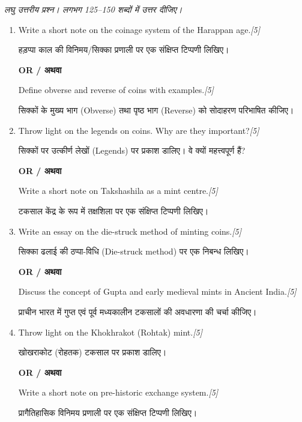 \documentclass[11pt,a4paper]{article}
\newcommand{\pts}[1]{\hfill \textit{[#1]}}
\begin{document}
\noindent \textit{लघु उत्तरीय प्रश्न। लगभग 125--150 शब्दों में उत्तर दीजिए।}

\begin{enumerate}[label=\textbf{\arabic*.},leftmargin=*,start=4,itemsep=10pt]

  \item Write a short note on the coinage system of the Harappan age.\pts{5}
  
  हड़प्पा काल की विनिमय/सिक्का प्रणाली पर एक संक्षिप्त टिप्पणी लिखिए।

  \begin{center}\textbf{OR / अथवा}\end{center}

  Define obverse and reverse of coins with examples.\pts{5}
  
  सिक्कों के मुख्य भाग (Obverse) तथा पृष्ठ भाग (Reverse) को सोदाहरण परिभाषित कीजिए।

  \item Throw light on the legends on coins. Why are they important?\pts{5}
  
  सिक्कों पर उत्कीर्ण लेखों (Legends) पर प्रकाश डालिए। वे क्यों महत्त्वपूर्ण हैं?

  \begin{center}\textbf{OR / अथवा}\end{center}

  Write a short note on Takshashila as a mint centre.\pts{5}
  
  टकसाल केंद्र के रूप में तक्षशिला पर एक संक्षिप्त टिप्पणी लिखिए।

  \item Write an essay on the die-struck method of minting coins.\pts{5}
  
  सिक्का ढलाई की ठप्पा-विधि (Die-struck method) पर एक निबन्ध लिखिए।

  \begin{center}\textbf{OR / अथवा}\end{center}

  Discuss the concept of Gupta and early medieval mints in Ancient India.\pts{5}
  
  प्राचीन भारत में गुप्त एवं पूर्व मध्यकालीन टकसालों की अवधारणा की चर्चा कीजिए।

  \item Throw light on the Khokhrakot (Rohtak) mint.\pts{5}
  
  खोखराकोट (रोहतक) टकसाल पर प्रकाश डालिए।

  \begin{center}\textbf{OR / अथवा}\end{center}

  Write a short note on pre-historic exchange system.\pts{5}
  
  प्रागैतिहासिक विनिमय प्रणाली पर एक संक्षिप्त टिप्पणी लिखिए।

\end{enumerate}
\end{document}
